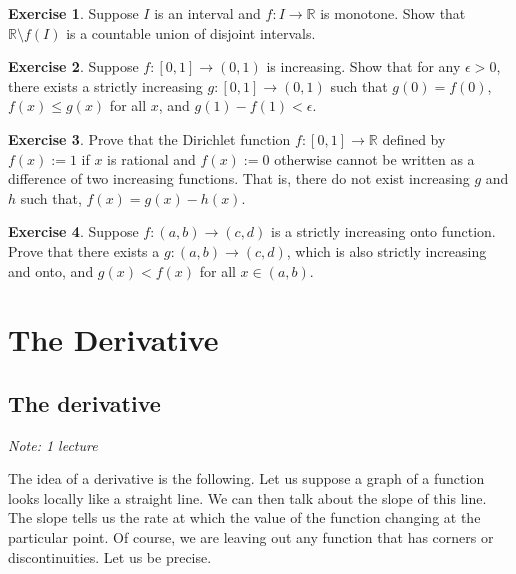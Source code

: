 \documentclass[12pt]{book}
\newcommand{\R}{{\mathbb{R}}}
\newcommand{\sectionnotes}[1]{\noindent \emph{Note: #1} \medskip \par}
\theoremstyle{plain}
\theoremstyle{remark}
\theoremstyle{definition}
\theoremstyle{exercise}
\newtheorem{exercise}{Exercise}[section]
\theoremstyle{example}
\begin{document}
\begin{exercise}
Suppose $I$ is an interval and $f \colon I \to \R$ is monotone.
Show that $\R \setminus f(I)$ is a countable union of disjoint intervals.
\end{exercise}

\begin{exercise}
Suppose $f \colon [0,1] \to (0,1)$ is increasing.  Show that for any
$\epsilon > 0$, there exists
a strictly increasing $g \colon [0,1] \to (0,1)$ such that
$g(0) = f(0)$, $f(x) \leq g(x)$ for all $x$, and $g(1)-f(1) < \epsilon$.
\end{exercise}

\begin{exercise}
Prove that the Dirichlet function $f \colon [0,1] \to\R$ defined by $f(x) :=
1$ if $x$ is rational and $f(x) := 0$ otherwise cannot be written as a
difference of two increasing functions.  That is, there do not exist
increasing $g$ and $h$ such that, $f(x) = g(x) - h(x)$.
\end{exercise}

\begin{exercise}
Suppose $f \colon (a,b) \to (c,d)$ is a strictly increasing
onto function.  Prove that there exists a $g \colon (a,b) \to (c,d)$,
which is also strictly increasing and onto, and $g(x) < f(x)$ for all $x \in
(a,b)$.
\end{exercise}




\chapter{The Derivative} \label{der:chapter}


\section{The derivative}
\label{sec:der}

\sectionnotes{1 lecture}

The idea of a derivative is the following.
Let us suppose a graph of a function looks locally like a straight line.
We can then talk about the slope of this line.  The slope tells us 
the rate at which 
the value of the function changing at the particular point.
Of course, we are leaving out any function that has corners or
discontinuities.  Let us be precise.
\end{document}
